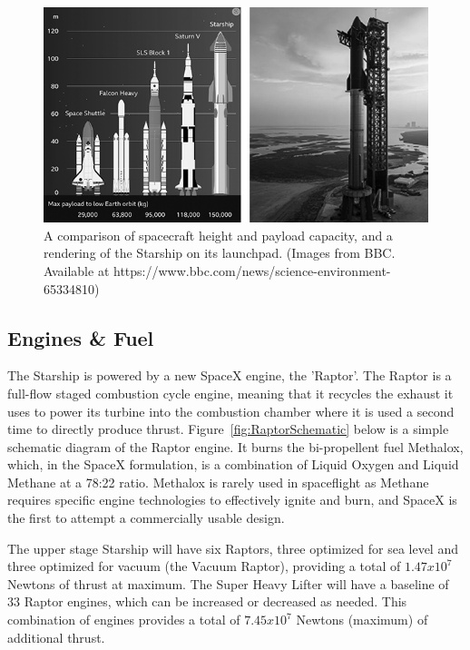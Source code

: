 \documentclass[11pt]{article}
\begin{document}
\begin{figure}[!b]
    \centering
    \includegraphics{assets/StarshipCompare.png}
    \caption{A comparison of spacecraft height and payload capacity, and a rendering of the Starship on its launchpad. (Images from BBC. Available at  https://www.bbc.com/news/science-environment-65334810)}
    \label{fig:EntireStarship}
\end{figure}

\subsection{Engines \& Fuel}
The Starship is powered by a new SpaceX engine, the 'Raptor'. The Raptor is a full-flow staged combustion cycle engine, meaning that it recycles the exhaust it uses to power its turbine into the combustion chamber where it is used a second time to directly produce thrust.\cite{website:wiki01} Figure~\ref{fig:RaptorSchematic} below is a simple schematic diagram of the Raptor engine. It burns the bi-propellent fuel Methalox, which, in the SpaceX formulation, is a combination of Liquid Oxygen and Liquid Methane at a 78:22 ratio.\cite{website:wiki01} Methalox is rarely used in spaceflight as Methane requires specific engine technologies to effectively ignite and burn, and SpaceX is the first to attempt a commercially usable design. 

The upper stage Starship will have six Raptors, three optimized for sea level and three optimized for vacuum (the Vacuum Raptor), providing a total of $1.47x10^7$ Newtons of thrust at maximum.  The Super Heavy Lifter will have a baseline of 33 Raptor engines, which can be increased or decreased as needed. This combination of engines provides a total of $7.45x10^7$ Newtons (maximum) of additional thrust.\cite{website:wiki01}
\end{document}
